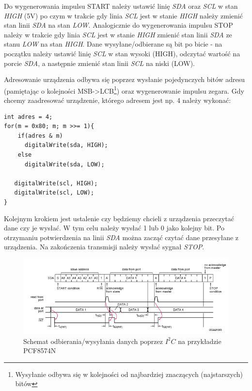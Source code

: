 \documentclass{xmgr}
\begin{document}
Do wygenerowania impulsu START należy ustawić linię \emph{SDA} oraz \emph{SCL} w stan \emph{HIGH} (5V) po czym w trakcie gdy linia \emph{SCL} jest w stanie \emph{HIGH} należy zmienić stan linii \emph{SDA} na stan \emph{LOW}. Analogicznie do wygenerowania impulsu STOP należy w trakcie gdy linia \emph{SCL} jest w stanie \emph{HIGH} zmienić stan linii \emph{SDA} ze stanu \emph{LOW} na stan \emph{HIGH}. Dane wysyłane/odbierane są bit po bicie - na początku należy ustawić linię \emph{SCL} w stan wysoki (HIGH), odczytać wartość na porcie \emph{SDA}, a następnie zmienić stan linii \emph{SCL} na niski (LOW).

Adresowanie urządzenia odbywa się poprzez wysłanie pojedynczych bitów adresu (pamiętając o kolejności MSB->LCB\footnote{Wysyłanie odbywa się w kolejności od najbardziej znaczących (najstarszych) bitów}) oraz wygenerowanie impulsu zegara. Gdy chcemy zaadresować urządzenie, którego adresem jest np. 4 należy wykonać:
\begin{lstlisting}[label=bot-dirs-alg,caption=Własna wersja adresowania urządzenia $I^2C$ na przykładzie PCF8574N]
int adres = 4;
for(m = 0x80; m; m >>= 1){
    if(adres & m)         
      digitalWrite(sda, HIGH);
    else
      digitalWrite(sda, LOW);
        
   digitalWrite(scl, HIGH);
   digitalWrite(scl, LOW); 
}
\end{lstlisting}

Kolejnym krokiem jest ustalenie czy będziemy chcieli z urządzenia przeczytać dane czy je wysłać. W tym celu należy wysłać 1 lub 0  jako kolejny bit. Po otrzymaniu potwierdzenia na linii \emph{SDA} można zacząć czytać dane przesyłane z urządzenia. Na zakończenia transmisji należy wysłać sygnał \emph{STOP}.

\begin{figure}[!h]
    \centering
    \includegraphics[height=0.25\textheight]{images/read_i2c.png}
    \caption{Schemat odbierania/wysyłania danych poprzez $I^2C$ na przykładzie PCF8574N\label{$I^2C$}}
\end{figure}
\end{document}
